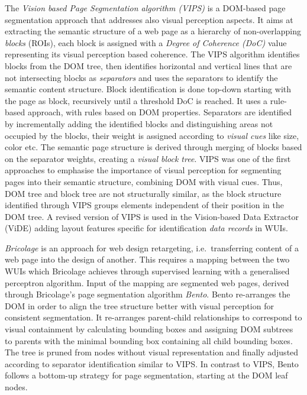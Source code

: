 The \emph{Vision based Page Segmentation algorithm (VIPS)} \autocite{Cai2003VIPS} is a DOM-based page segmentation approach that addresses also visual perception aspects.
It aims at extracting the semantic structure of a web page as a hierarchy of non-overlapping \emph{blocks} (ROIs), each block is assigned with a \emph{Degree of Coherence (DoC)} value representing its visual perception based coherence.
The VIPS algorithm identifies blocks from the DOM tree, then identifies horizontal and vertical lines that are not intersecting blocks as \emph{separators} and uses the separators to identify the semantic content structure.
Block identification is done top-down starting with the page as block, recursively until a threshold DoC is reached.
It uses a rule-based approach, with rules based on DOM properties.
Separators are identified by incrementally adding the identified blocks and distinguishing areas not occupied by the blocks, their weight is assigned according to \emph{visual cues} like size, color etc.
The semantic page structure is derived through merging of blocks based on the separator weights, creating a \emph{visual block tree}.
VIPS was one of the first approaches to emphasise the importance of visual perception for segmenting pages into their semantic structure, combining DOM with visual cues.
Thus, DOM tree and block tree are not structurally similar, as the block structure identified through VIPS groups elements independent of their position in the DOM tree.
A revised version of VIPS is used in the Vision-based Data Extractor (ViDE) \autocite{Liu2010VIDE} adding layout features specific for identification \emph{data records} in WUIs.

\emph{Bricolage} \autocite{Talton2011Bricolage} is an approach for web design retargeting, i.e.~transferring content of a web page into the design of another.
This requires a mapping between the two WUIs which Bricolage achieves through supervised learning with a generalised perceptron algorithm.
Input of the mapping are segmented web pages, derived through Bricolage's page segmentation algorithm \emph{Bento}.
Bento re-arranges the DOM in order to align the tree structure better with visual perception for consistent segmentation.
It re-arranges parent-child relationships to correspond to visual containment by calculating bounding boxes and assigning DOM subtrees to parents with the minimal bounding box containing all child bounding boxes.
The tree is pruned from nodes without visual representation and finally adjusted according to separator identification similar to VIPS.
In contrast to VIPS, Bento follows a bottom-up strategy for page segmentation, starting at the DOM leaf nodes.

